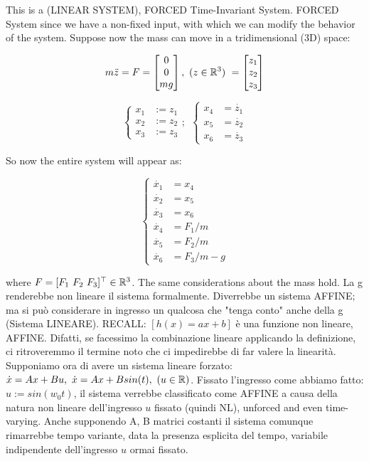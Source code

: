 This is a (LINEAR SYSTEM), FORCED Time-Invariant System. FORCED System since we have a non-fixed input, with which we can modify the behavior of the system. Suppose now the mass can move in a tridimensional (3D) space:

\[
	m\ddot{z} = F =
	\begin{bmatrix}
	0 \\
	0 \\
	mg
	\end{bmatrix},\ (z \in \mathbb{R}^3)\ =
	\begin{bmatrix}
	z_1 \\
	z_2 \\
	z_3
	\end{bmatrix}
\]

\[
	\left\{
	\begin{aligned}
	x_1 &:= z_1 \\
	x_2 &:= z_2 \\
	x_3 &:= z_3
	\end{aligned} 
	\right.
	;\ \ \left\{
	\begin{aligned}
	x_4 &= \dot{z_1} \\
	x_5 &= \dot{z_2} \\
	x_6 &= \dot{z_3}
	\end{aligned} 
	\right.
\]

So now the entire system will appear as:

\[
	\left\{
	\begin{aligned}
	\dot{x_1} &= x_4 \\
	\dot{x_2} &= x_5 \\
	\dot{x_3} &= x_6 \\
	\dot{x_4} &= F_1/m \\
	\dot{x_5} &= F_2/m \\
	\dot{x_6} &= F_3/m - g
	\end{aligned} 
	\right.
\]

where $F = [F_1\ F_2\ F_3]^{\top} \in \mathbb{R}^3$. The same considerations about the mass hold.
La g renderebbe non lineare il sistema formalmente. Diverrebbe un sistema AFFINE; ma si può considerare in ingresso un qualcosa che "tenga conto" anche della g (Sistema LINEARE).
RECALL: $[h(x) = ax + b]$ è una funzione non lineare, AFFINE. Difatti, se facessimo la combinazione lineare applicando la definizione, ci ritroveremmo il termine noto che ci impedirebbe di far valere la linearità. Supponiamo ora di avere un sistema lineare forzato: $\dot{x} = Ax + Bu,\ \dot{x} = Ax + Bsin(t),\ (u \in \mathbb{R})$.
Fissato l'ingresso come abbiamo fatto: $u := sin(w_0t)$, il sistema verrebbe classificato come AFFINE a causa della natura non lineare dell'ingresso $u$ fissato (quindi NL), unforced and even time-varying. Anche supponendo A, B matrici costanti il sistema comunque rimarrebbe tempo variante, data la presenza esplicita del tempo, variabile indipendente dell'ingresso $u$ ormai fissato.

